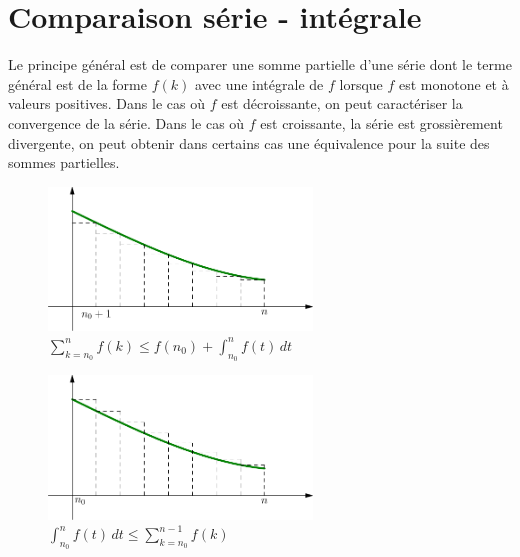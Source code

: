 \clearpage
\section{Comparaison série - intégrale}
Le principe général est de comparer une somme partielle d'une série dont le terme général est de la forme $f(k)$ avec une intégrale de $f$ lorsque $f$ est monotone et à valeurs positives. Dans le cas où $f$ est décroissante, on peut caractériser la convergence de la série. Dans le cas où $f$ est croissante, la série est grossièrement divergente, on peut obtenir dans certains cas une équivalence pour la suite des sommes partielles.

\begin{figure}[ht]
    \centering
    \includegraphics[width=7cm]{./C9650_1.pdf}
    \caption{$\sum_{k=n_0}^{n}f(k) \leq f(n_0) +\int_{n_0}^nf(t)\,dt$}
    \label{fig:C9650_1}
\end{figure}

\begin{figure}[ht]
    \centering
    \includegraphics[width=7cm]{./C9650_2.pdf}
    \caption{$\int_{n_0}^nf(t)\,dt \leq \sum_{k=n_0}^{n-1}f(k)$}
    \label{fig:C9650_2}
\end{figure}


